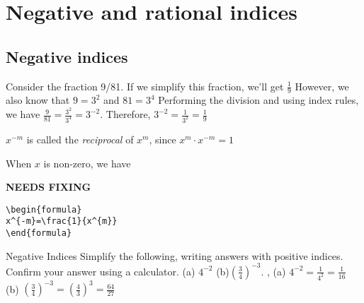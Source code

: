 \section{Negative and rational indices}
\subsection{Negative indices}
Consider the fraction 9/81.
If we simplify this fraction, we'll get $\frac{1}{9}$
However, we also know that $9=3^{2}$ and $81=3^{4}$
Performing the division and using index rules, we have $\frac{9}{81}=\frac{3^{2}}{3^{4}}=3^{-2}$.
Therefore, $3^{-2}=\frac{1}{3^2}=\frac{1}{9}$

$x^{-m}$ is called the \textit{reciprocal} of $x^{m}$, since $x^{m} \cdot x^{-m}=1$ %

When $x$ is non-zero, we have

{\hfill\Large\bfseries NEEDS FIXING\hfill}
\begin{lstlisting}
\begin{formula}
x^{-m}=\frac{1}{x^{m}} 
\end{formula}
 \end{lstlisting}
\begin{example}{Negative Indices}
Simplify the following, writing answers with positive indices. Confirm your answer using a calculator.
(a) $4^{-2}$ \hspace{1cm} (b)$\left(\frac{3}{4}\right)^{-3}$.
\sep
(a) $4^{-2}=\frac{1}{4^2}=\frac{1}{16}$$$$$
(b) $\left(\frac{3}{4}\right)^{-3}=\left(\frac{4}{3}\right)^{3}=\frac{64}{27}$
\end{example}

